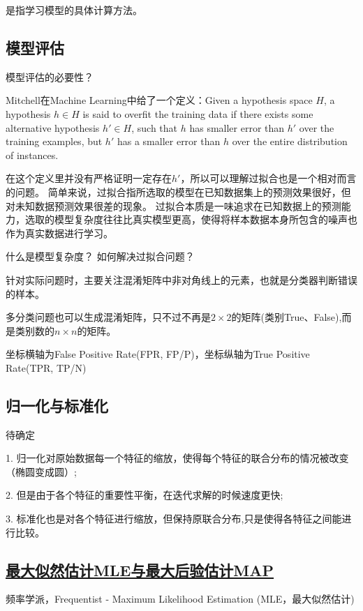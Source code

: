 {}是指学习模型的具体计算方法。


\subsection{模型评估}
模型评估的必要性？

{}

Mitchell在Machine Learning中给了一个定义：Given a hypothesis space $H$, a hypothesis $h \in H$ 
is said to overfit the training data if there exists some alternative hypothesis $h' \in H$,
such that $h$ has smaller error than $h'$ over the training examples, but $h'$ has a smaller
error than $h$ over the entire distribution of instances.

在这个定义里并没有严格证明一定存在$h'$，所以可以理解过拟合也是一个相对而言的问题。
简单来说，过拟合指所选取的模型在已知数据集上的预测效果很好，但对未知数据预测效果很差的现象。
过拟合本质是一味追求在已知数据上的预测能力，选取的模型复杂度往往比真实模型更高，使得将样本数据本身所包含的噪声也作为真实数据进行学习。

什么是模型复杂度？
如何解决过拟合问题？

{}

针对实际问题时，主要关注混淆矩阵中非对角线上的元素，也就是分类器判断错误的样本。

多分类问题也可以生成混淆矩阵，只不过不再是$2 \times 2$的矩阵(类别True、False),而是类别数的$n \times n$的矩阵。

{}

坐标横轴为False Positive Rate(FPR, FP/P)，坐标纵轴为True Positive Rate(TPR, TP/{\color{red}N})


\subsection{归一化与标准化}
待确定

1. 归一化对原始数据每一个特征的缩放，使得每个特征的联合分布的情况被改变（椭圆变成圆）;

2. 但是由于各个特征的重要性平衡，在迭代求解的时候速度更快;

3. 标准化也是对各个特征进行缩放，但保持原联合分布,只是使得各特征之间能进行比较。

\subsection{\href{https://zhuanlan.zhihu.com/p/32480810}{最大似然估计MLE与最大后验估计MAP}}
频率学派，Frequentist - Maximum Likelihood Estimation (MLE，最大似然估计)

